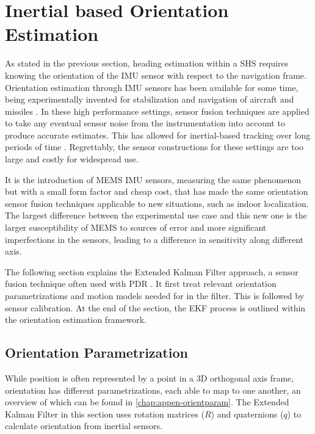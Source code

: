 \section{Inertial based Orientation Estimation}
\label{sec:rw-orientation_estimation}
As stated in the previous section, heading estimation within a \acl{SHS} requires knowing the orientation of the \ac{IMU} sensor with respect to the navigation frame. Orientation estimation through \ac{IMU} sensors has been available for some time, being experimentally invented for stabilization and navigation of aircraft and missiles \cite{titterton2004strapdown}. In these high performance settings, sensor fusion techniques are applied to take any eventual sensor noise from the instrumentation into account to produce accurate estimates. This has allowed for inertial-based tracking over long periods of time \cite{Harle2013}. Regrettably, the sensor constructions for these settings are too large and costly for widespread use.\par  

It is the introduction of \ac{MEMS} \ac{IMU} sensors, measuring the same phenomenon but with a small form factor and cheap cost, that has made the same orientation sensor fusion techniques applicable to new situations, such as indoor localization.  The largest difference between the experimental use case and this new one is the larger susceptibility of MEMS to sources of error and more significant imperfections in the sensors, leading to a difference in sensitivity along different axis. \par 

The following section explains the Extended Kalman Filter approach, a sensor fusion technique often used with PDR \cite{Michel2015a,Michel2018, Diaz2014}. It first treat relevant orientation parametrizations and motion models needed for in the filter. This is followed by sensor calibration. At the end of the section, the EKF process is outlined within the orientation estimation framework.


\subsection{Orientation Parametrization}
While position is often represented by a point in a 3D orthogonal axis frame, orientation has different parametrizations, each able to map to one another, an overview of which can be found in \cref{chap:appen-orientparam}. The Extended Kalman Filter in this section uses rotation matrices ($R$) and quaternions ($q$) to calculate orientation from inertial sensors.

